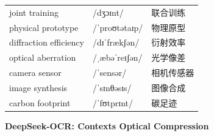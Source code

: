 \documentclass[UTF8,12pt,a4paper]{ctexart}
\providecommand{\zh}[1]{#1}
\begin{document}
\begin{tabular*}{\textwidth}{@{\extracolsep{\fill}}lll@{}}
joint training & {\ipafont /dʒɔɪnt/} & \zh{联合训练} \\
physical prototype & {\ipafont /ˈproʊtətaɪp/} & \zh{物理原型} \\
diffraction efficiency & {\ipafont /dɪˈfrækʃən/} & \zh{衍射效率} \\
optical aberration & {\ipafont /ˌæbəˈreɪʃən/} & \zh{光学像差} \\
camera sensor & {\ipafont /ˈsensər/} & \zh{相机传感器} \\
image synthesis & {\ipafont /ˈsɪnθəsɪs/} & \zh{图像合成} \\
carbon footprint & {\ipafont /ˈfʊtprɪnt/} & \zh{碳足迹} \\
\bottomrule
\end{tabular*}

\newpage

\begin{center}
    {\Large\bfseries DeepSeek-OCR: Contexts Optical Compression}
\end{center}
\end{document}
